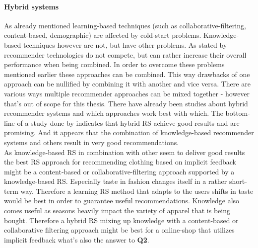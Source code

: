 \paragraph{Hybrid systems}
As already mentioned learning-based techniques (such as collaborative-filtering, content-based, demographic) are affected by cold-start problems.
Knowledge-based techniques however are not, but have other problems.
As stated by \citeauthor{herlocker:2000} recommender technologies do not compete, but can rather increase their overall performance when being combined.\citep[p.~241]{herlocker:2000}
In order to overcome these problems mentioned earlier these approaches can be combined.
This way drawbacks of one approach can be nullified by combining it with another and vice versa.
There are various ways multiple recommender approaches can be mixed together - however that's out of scope for this thesis.
\citep[p.~378-380]{burke:2007}
There have already been studies about hybrid recommender systems and which approaches work best with which.
The bottom-line of a study done by \citeauthor{burke:2007} indicates that hybrid RS achieve good results and are promising.
And it appears that the combination of knowledge-based recommender systems and others result in very good recommendations.
\citep[p.~405-406]{burke:2007}
\\

As knowledge-based RS in combination with other seem to deliver good results the best RS approach for recommending clothing based on implicit feedback might be a content-based or collaborative-filtering approach supported by a knowledge-based RS.
Especially taste in fashion changes itself in a rather short-term way.
Therefore a learning RS method that adapts to the users shifts in taste would be best in order to guarantee useful recommendations.
Knowledge also comes useful as seasons heavily impact the variety of apparel that is being bought.
Therefore a hybrid RS mixing up knowledge with a content-based or collaborative filtering approach might be best for a online-shop that utilizes implicit feedback what's also the answer to \textbf{Q2}.

